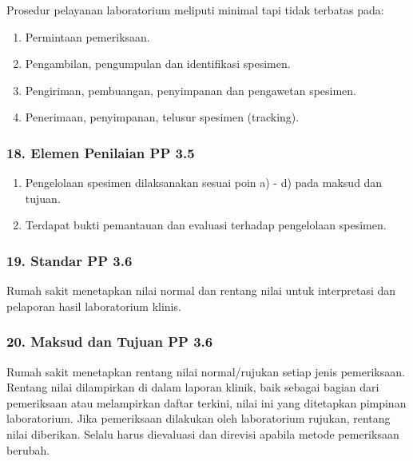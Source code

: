 \documentclass[
]{book}
\providecommand{\tightlist}{%
  \setlength{\itemsep}{0pt}\setlength{\parskip}{0pt}}
\begin{document}
Prosedur pelayanan laboratorium meliputi minimal tapi tidak terbatas pada:

\begin{enumerate}
\def\labelenumi{\alph{enumi}.}
\tightlist
\item
  Permintaan pemeriksaan.
\item
  Pengambilan, pengumpulan dan identifikasi spesimen.
\item
  Pengiriman, pembuangan, penyimpanan dan pengawetan spesimen.
\item
  Penerimaan, penyimpanan, telusur spesimen (tracking).
\end{enumerate}

\hypertarget{elemen-penilaian-pp-3.5}{%
\subsubsection*{18. Elemen Penilaian PP 3.5}\label{elemen-penilaian-pp-3.5}}

\begin{enumerate}
\def\labelenumi{\alph{enumi}.}
\tightlist
\item
  Pengelolaan spesimen dilaksanakan sesuai poin a) - d) pada maksud dan tujuan.
\item
  Terdapat bukti pemantauan dan evaluasi terhadap pengelolaan spesimen.
\end{enumerate}

\hypertarget{standar-pp-3.6}{%
\subsubsection*{19. Standar PP 3.6}\label{standar-pp-3.6}}

Rumah sakit menetapkan nilai normal dan rentang nilai untuk interpretasi dan pelaporan hasil laboratorium klinis.

\hypertarget{maksud-dan-tujuan-pp-3.6}{%
\subsubsection*{20. Maksud dan Tujuan PP 3.6}\label{maksud-dan-tujuan-pp-3.6}}

Rumah sakit menetapkan rentang nilai normal/rujukan setiap jenis pemeriksaan. Rentang nilai dilampirkan di dalam laporan klinik, baik sebagai bagian dari pemeriksaan atau melampirkan daftar terkini, nilai ini yang ditetapkan pimpinan laboratorium. Jika pemeriksaan dilakukan oleh laboratorium rujukan, rentang nilai diberikan. Selalu harus dievaluasi dan direvisi apabila metode pemeriksaan berubah.
\end{document}
